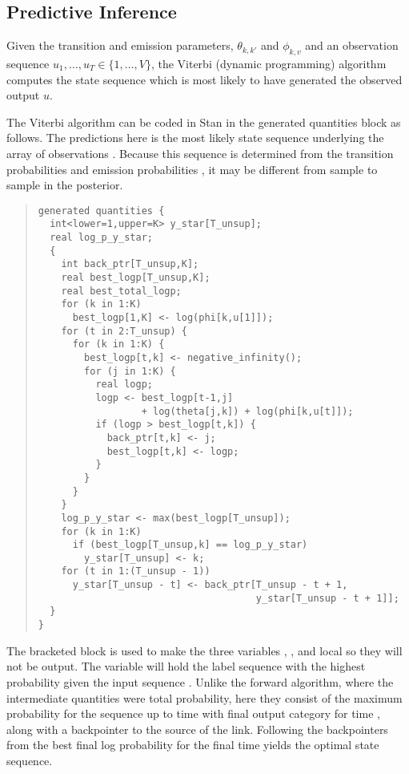 \subsection{Predictive Inference}

Given the transition and emission parameters, $\theta_{k,k'}$ and
$\phi_{k,v}$ and an observation sequence $u_1,\ldots,u_T \in \{
1,\ldots,V \}$, the Viterbi (dynamic programming) algorithm
computes the state sequence which is most likely to have generated the
observed output $u$.  

The Viterbi algorithm can be coded in Stan in the generated quantities
block as follows.  The predictions here is the most likely state
sequence  underlying the
array of observations .  Because this
sequence is determined from the transition probabilities
 and emission probabilities , it may be
different from sample to sample in the posterior.
%
\begin{quote}
\begin{Verbatim}[fontsize=\small]
generated quantities {
  int<lower=1,upper=K> y_star[T_unsup];
  real log_p_y_star;
  { 
    int back_ptr[T_unsup,K];
    real best_logp[T_unsup,K];
    real best_total_logp;
    for (k in 1:K)
      best_logp[1,K] <- log(phi[k,u[1]]);
    for (t in 2:T_unsup) {
      for (k in 1:K) {
        best_logp[t,k] <- negative_infinity();
        for (j in 1:K) {
          real logp;
          logp <- best_logp[t-1,j] 
                  + log(theta[j,k]) + log(phi[k,u[t]]);
          if (logp > best_logp[t,k]) {
            back_ptr[t,k] <- j;
            best_logp[t,k] <- logp;
          }
        }
      }
    }
    log_p_y_star <- max(best_logp[T_unsup]);
    for (k in 1:K)
      if (best_logp[T_unsup,k] == log_p_y_star)
        y_star[T_unsup] <- k;
    for (t in 1:(T_unsup - 1))
      y_star[T_unsup - t] <- back_ptr[T_unsup - t + 1, 
                                      y_star[T_unsup - t + 1]];
  }
}
\end{Verbatim}
\end{quote}
%
The bracketed block is used to make the three variables
, , and 
local so they will not be output.  The variable  will
hold the label sequence with the highest probability given the input
sequence .  Unlike the forward algorithm, where the
intermediate quantities were total probability, here they consist of
the maximum probability  for the sequence up to
time  with final output category  for time ,
along with a backpointer to the source of the link.  Following the
backpointers from the best final log probability for the final time
 yields the optimal state sequence.

